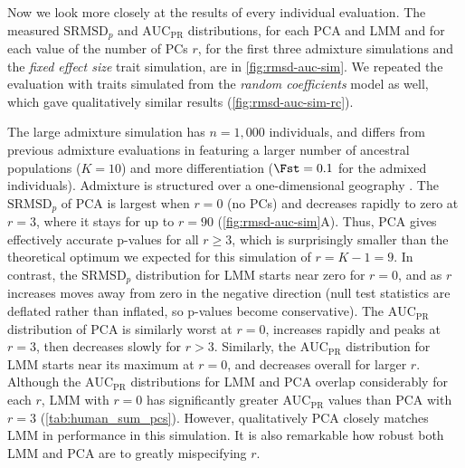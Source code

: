 \documentclass[11pt]{article}
\newcommand{\rmsd}{\text{SRMSD}_p}
\newcommand{\auc}{\text{AUC}_\text{PR}}
\begin{document}
Now we look more closely at the results of every individual evaluation.
The measured $\rmsd$ and $\auc$ distributions, for each PCA and LMM and for each value of the number of PCs $r$, for the first three admixture simulations and the \textit{fixed effect size} trait simulation, are in \cref{fig:rmsd-auc-sim}.
We repeated the evaluation with traits simulated from the \textit{random coefficients} model as well, which gave qualitatively similar results (\cref{fig:rmsd-auc-sim-rc}).

The large admixture simulation has $n = 1,000$ individuals, and differs from previous admixture evaluations in featuring a larger number of ancestral populations ($K=10$) and more differentiation ($\Fst = 0.1$ for the admixed individuals).
Admixture is structured over a one-dimensional geography \citep{ochoa_estimating_2021}.
The $\rmsd$ of PCA is largest when $r=0$ (no PCs) and decreases rapidly to zero at $r=3$, where it stays for up to $r=90$ (\cref{fig:rmsd-auc-sim}A).
Thus, PCA gives effectively accurate p-values for all $r \ge 3$, which is surprisingly smaller than the theoretical optimum we expected for this simulation of $r = K - 1 = 9$.
In contrast, the $\rmsd$ distribution for LMM starts near zero for $r=0$, and as $r$ increases moves away from zero in the negative direction (null test statistics are deflated rather than inflated, so p-values become conservative).
The $\auc$ distribution of PCA is similarly worst at $r=0$, increases rapidly and peaks at $r = 3$, then decreases slowly for $r > 3$.
Similarly, the $\auc$ distribution for LMM starts near its maximum at $r=0$, and decreases overall for larger $r$.
Although the $\auc$ distributions for LMM and PCA overlap considerably for each $r$, LMM with $r=0$ has significantly greater $\auc$ values than PCA with $r=3$ (\cref{tab:human_sum_pcs}).
However, qualitatively PCA closely matches LMM in performance in this simulation.
It is also remarkable how robust both LMM and PCA are to greatly mispecifying $r$.
\end{document}
